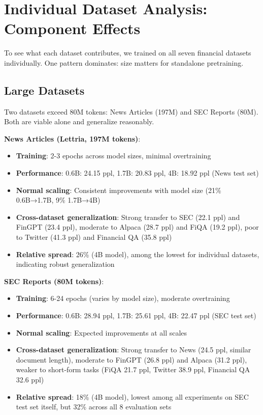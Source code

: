 \section{Individual Dataset Analysis: Component Effects}

To see what each dataset contributes, we trained on all seven financial datasets individually. One pattern dominates: size matters for standalone pretraining.

\subsection{Large Datasets}

Two datasets exceed 80M tokens: News Articles (197M) and SEC Reports (80M). Both are viable alone and generalize reasonably.

\textbf{News Articles (Lettria, 197M tokens)}:
\begin{itemize}
\item \textbf{Training}: 2-3 epochs across model sizes, minimal overtraining
\item \textbf{Performance}: 0.6B: 24.15 ppl, 1.7B: 20.83 ppl, 4B: 18.92 ppl (News test set)
\item \textbf{Normal scaling}: Consistent improvements with model size (21\% 0.6B→1.7B, 9\% 1.7B→4B)
\item \textbf{Cross-dataset generalization}: Strong transfer to SEC (22.1 ppl) and FinGPT (23.4 ppl), moderate to Alpaca (28.7 ppl) and FiQA (19.2 ppl), poor to Twitter (41.3 ppl) and Financial QA (35.8 ppl)
\item \textbf{Relative spread}: 26\% (4B model), among the lowest for individual datasets, indicating robust generalization
\end{itemize}

\textbf{SEC Reports (80M tokens)}:
\begin{itemize}
\item \textbf{Training}: 6-24 epochs (varies by model size), moderate overtraining
\item \textbf{Performance}: 0.6B: 28.94 ppl, 1.7B: 25.61 ppl, 4B: 22.47 ppl (SEC test set)
\item \textbf{Normal scaling}: Expected improvements at all scales
\item \textbf{Cross-dataset generalization}: Strong transfer to News (24.5 ppl, similar document length), moderate to FinGPT (26.8 ppl) and Alpaca (31.2 ppl), weaker to short-form tasks (FiQA 21.7 ppl, Twitter 38.9 ppl, Financial QA 32.6 ppl)
\item \textbf{Relative spread}: 18\% (4B model), lowest among all experiments on SEC test set itself, but 32\% across all 8 evaluation sets
\end{itemize}

